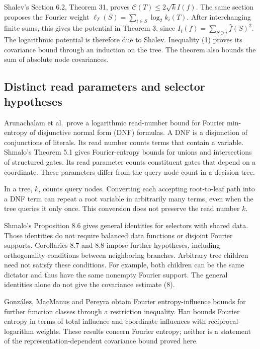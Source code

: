 \documentclass[
  american,
  11pt,
]{article}
\newcounter{none} %
\begin{document}
Shalev's Section 6.2, Theorem 31, proves
\(\mathcal C(T)\leq2\sqrt{k}I(f)\). The same section proposes the
Fourier weight \(\ell_T(S)=\sum_{i\in S}\log_2 k_i(T)\). After
interchanging finite sums, this gives the potential in Theorem 3, since
\(I_i(f)=\sum_{S\ni i}\widehat f(S)^2\). The logarithmic potential is
therefore due to Shalev. Inequality (1) proves its covariance bound
through an induction on the tree. The theorem also bounds the sum of
absolute node covariances.

\subsection{Distinct read parameters and selector
hypotheses}\label{distinct-read-parameters-and-selector-hypotheses}

Arunachalam et al.~prove a logarithmic read-number bound for Fourier
min-entropy of disjunctive normal form (DNF) formulas. A DNF is a
disjunction of conjunctions of literals. Its read number counts terms
that contain a variable. Shmalo's Theorem 5.1 gives Fourier-entropy
bounds for unions and intersections of structured gates. Its read
parameter counts constituent gates that depend on a coordinate. These
parameters differ from the query-node count in a decision tree.

In a tree, \(k_i\) counts query nodes. Converting each accepting
root-to-leaf path into a DNF term can repeat a root variable in
arbitrarily many terms, even when the tree queries it only once. This
conversion does not preserve the read number \(k\).

Shmalo's Proposition 8.6 gives general identities for selectors with
shared data. Those identities do not require balanced data functions or
disjoint Fourier supports. Corollaries 8.7 and 8.8 impose further
hypotheses, including orthogonality conditions between neighboring
branches. Arbitrary tree children need not satisfy these conditions. For
example, both children can be the same dictator and thus have the same
nonempty Fourier support. The general identities alone do not give the
covariance estimate (8).

González, MacManus and Pereyra obtain Fourier entropy-influence bounds
for further function classes through a restriction inequality. Han
bounds Fourier entropy in terms of total influence and coordinate
influences with reciprocal-logarithm weights. These results concern
Fourier entropy; neither is a statement of the representation-dependent
covariance bound proved here.
\end{document}
